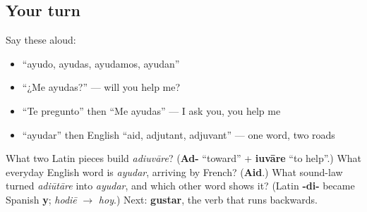\subsection*{Your turn}
Say these aloud:

\begin{itemize}
\raggedright
  \item \textquotedblleft{}ayudo, ayudas, ayudamos, ayudan\textquotedblright{}
  \item \textquotedblleft{}¿Me ayudas?\textquotedblright{} — will you help me?
  \item \textquotedblleft{}Te pregunto\textquotedblright{} then \textquotedblleft{}Me ayudas\textquotedblright{} — I ask you, you help me
  \item \textquotedblleft{}ayudar\textquotedblright{} then English \textquotedblleft{}aid, adjutant, adjuvant\textquotedblright{} — one word, two roads
\end{itemize}

\begin{tcolorbox}[breakable,colback=teal!4,colframe=teal!35!black,title={Before you move on}]
What two Latin pieces build \emph{adiuvāre}? (\textbf{Ad-} \textquotedblleft{}toward\textquotedblright{} + \textbf{iuvāre} \textquotedblleft{}to help\textquotedblright{}.) What everyday English word is \emph{ayudar}, arriving by French? (\textbf{Aid}.) What sound-law turned \emph{adiūtāre} into \emph{ayudar}, and which other word shows it? (Latin \textbf{-di-} became Spanish \textbf{y}; \emph{hodiē} $\to$ \emph{hoy}.) Next: \textbf{gustar}, the verb that runs backwards.
\end{tcolorbox}
